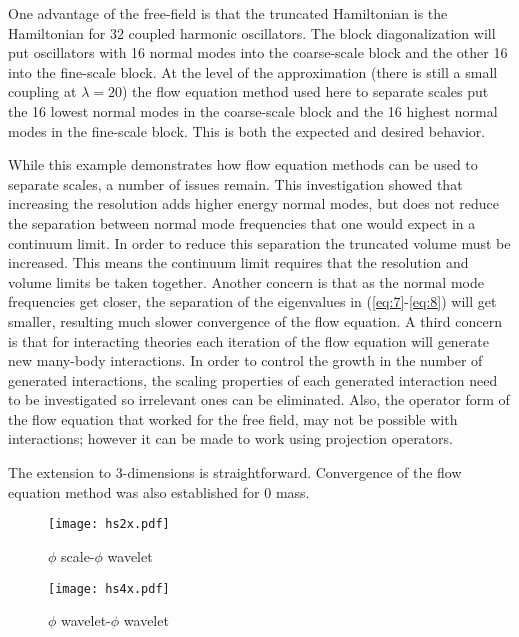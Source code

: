 \documentclass[aps,prc,reprint,showpacs,groupedaddress,onecolumn]{revtex4}
\begin{document}
One advantage of the free-field is that the truncated Hamiltonian is
the Hamiltonian for 32 coupled harmonic oscillators.  The block
diagonalization will put oscillators with 16 normal modes into the
coarse-scale block and the other 16 into the fine-scale block.  At the
level of the approximation (there is still a small coupling at
$\lambda=20$) the flow equation method used here to separate scales
put the 16 lowest normal modes in the coarse-scale block and the 16
highest normal modes in the fine-scale block.  This is both the
expected and desired behavior.

While this example demonstrates how flow equation methods can be used
to separate scales, a number of issues remain.  This investigation
showed that increasing the resolution adds higher energy normal modes,
but does not reduce the separation between normal mode frequencies
that one would expect in a continuum limit.  In order to reduce this
separation the truncated volume must be increased.  This means the
continuum limit requires that the resolution and volume limits be
taken together.  Another concern is that as the normal mode frequencies get
closer, the separation of the eigenvalues in (\ref{eq:7}-\ref{eq:8})
will get smaller, resulting much slower convergence of the flow
equation.  A third concern is that for interacting theories each
iteration of the flow equation will generate new many-body
interactions.  In order to control the growth in the number of
generated interactions, the scaling properties of each generated
interaction need to be investigated so irrelevant ones can be
eliminated.  Also, the operator form of the flow equation that worked
for the free field, may not be possible with interactions; however it
can be made to work using projection operators.

The extension to 3-dimensions is straightforward.  Convergence of the 
flow equation method was also established for 0 mass.


\begin{figure}
\begin{minipage}[t]{.45\linewidth}
\centering
\texttt{[image: hs2x.pdf]}
\caption{$\phi$ scale-$\phi$ wavelet}
\label{fig:3}
\end{minipage}
\begin{minipage}[t]{.45\linewidth}
\centering
\texttt{[image: hs4x.pdf]}
\caption{$\phi$ wavelet-$\phi$ wavelet}
\label{fig:4}
\end{minipage}
\end{figure}
\end{document}
